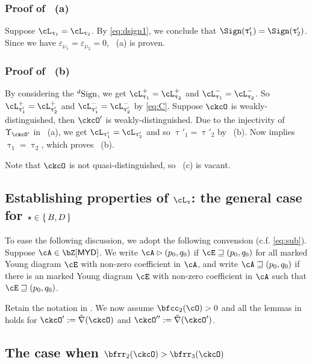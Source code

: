 \documentclass[12pt,a4paper]{amsart}
\def\MYD{{\mathsf{MYD}}}
\def\DD{\nabla}
\numberwithin{equation}{section}
\theoremstyle{remark}
\def\ckDD{{\check\DD}}
\begin{document}
\subsubsection*{Proof of ~(a)}
Suppose $\ac_{\uptau_{1}}=\ac_{\uptau_{2}}$. By \eqref{eq:dsign1},
we conclude that $\Sign(\uptau'_{1})=\Sign(\uptau'_{2})$. Since we have
$\varepsilon_{\wp_{1}}=\varepsilon_{\wp_{2}}=0$, ~(a) is proven.



\subsubsection*{Proof of ~(b)}
By considering the ${}^d\mathrm{Sign}$,  we get $\pac{\uptau_1}=\pac{\uptau_2}$
and $\nac{\uptau_1}=\nac{\uptau_2}$. So $\pac{\uptau'_{1}}=\pac{\uptau'_{2}}$ and
$\nac{\uptau'_{1}}=\nac{\uptau'_{2}}$ by \eqref{eq:C}.
Suppose $\ckcO$ is weakly-distinguished, then $\ckcO'$ is
weakly-distinguished.
Due to the injectivity of $\Upsilon_{\ckcO'}$ in ~(a), we get
$\ac_{\uptau'_{1}}=\ac_{\uptau'_{2}}$ and so $\uptau'_{1}=\uptau'_{2}$ by ~(b). 
Now  implies $\uptau_{1}=\uptau_{2}$, which proves ~(b).

\smallskip

Note that $\ckcO$ is not quasi-distinguished, so ~(c) is vacant.


\subsection{Establishing properties of $\ac_{\uptau}$: the general case for $\star\in \set{B,D}$}\label{generalBD}


To ease the following discussion, we adopt the following convension (c.f. \eqref{eq:sub}).
Suppose $\cA\in \bZ[\MYD]$. We write $\cA\rhd (p_{0},q_{0})$ if
$\cE \sqsupseteq (p_{0},q_{0})$ for all marked Young diagram $\cE$ with non-zero coefficient in
$\cA$, and write $\cA \sqsupseteq (p_{0},q_{0})$ if there is an marked Young diagram $\cE$ with
non-zero coefficient in $\cA$ such that $\cE\sqsupseteq (p_{0},q_{0})$.

\smallskip
Retain the notation in .
We now assume $\bfcc_{2}(\cO)>0$ and all the lemmas in  
holds for $\ckcO':=\ckDD(\ckcO)$ and $\ckcO'' := \ckDD(\ckcO')$.  



\subsection*{The case when $\bfrr_{2}(\ckcO)>\bfrr_{3}(\ckcO)$}
\end{document}
